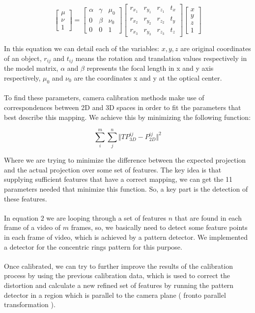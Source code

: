 \documentclass[journal]{IEEEtran}
\begin{document}
\begin{equation}
  \begin{bmatrix}
    \mu \\
    \nu \\
      1
  \end{bmatrix} =
  \begin{bmatrix}
    \alpha & \gamma & \mu_{0} \\
       0   & \beta  & \nu_{0} \\
       0   &    0   &    1
  \end{bmatrix}
  \begin{bmatrix}
    r_{x_{1}} & r_{y_{1}} & r_{z_{1}} & t_{x}\\
    r_{x_{2}} & r_{y_{2}} & r_{z_{2}} & t_{y}\\
    r_{x_{3}} & r_{y_{3}} & r_{z_{3}} & t_{z}
  \end{bmatrix}
  \begin{bmatrix}
    x \\
    y \\
    z \\
    1
  \end{bmatrix}
%
\end{equation}

In this equation we can detail each of the variables: $x,y,z$ are original coordinates of an object, $r_{ij}$ and $t_{ij}$ means the rotation and translation values respectively in the model matrix, $\alpha$ and $\beta$ represents the focal length in x and y axis respectively, $\mu_0$ and $\nu_0$ are the coordinates x and y at the optical center.
\\
\\
To find these parameters, camera calibration methods make use of correspondences between 2D and 3D spaces in order to fit the parameters that best describe this mapping. We achieve this by minimizing the following function:

\begin{equation}
  \sum^{m}_{i} \sum^{n}_{j} \Vert TP^{ij}_{3D} - P^{ij}_{2D} \Vert^{2}
\end{equation}

Where we are trying to minimize the difference between the expected projection and the actual projection over some set of features. The key idea is that supplying sufficient features that have a correct mapping, we can get the 11 parameters needed that minimize this function. So, a key part is the detection of these features.
\\
\\
In equation $2$ we are looping through a set of features $n$ that are found in each frame of a video of $m$ frames, so, we basically need to detect some feature points in each frame of video, which is achieved by a pattern detector. We implemented a detector for the concentric rings pattern for this purpose.
\\
\\
Once calibrated, we can try to further improve the results of the calibration process by using the previous calibration data, which is used to correct the distortion and calculate a new refined set of features by running the pattern detector in a region which is parallel to the camera plane ( fronto parallel transformation ).
\end{document}

